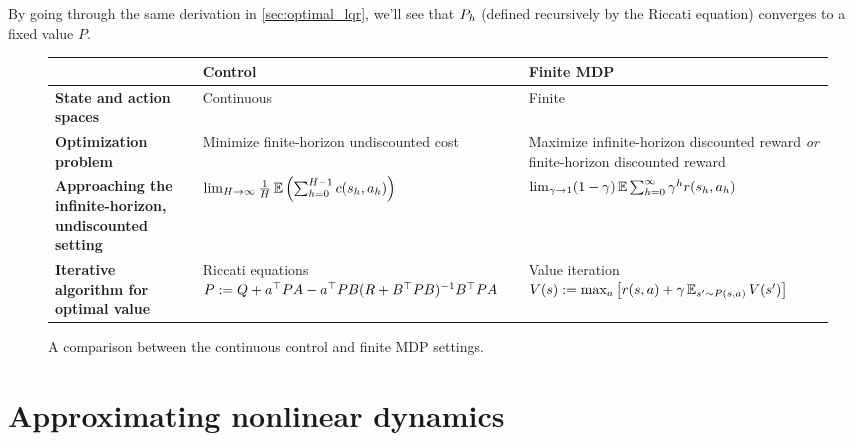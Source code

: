 \documentclass[\main/main]{subfiles}
\begin{document}
    By going through the same derivation in \autoref{sec:optimal_lqr}, we'll see that $P_h$ (defined recursively by the Riccati equation) converges to a fixed value $P$.



    \begin{figure}[h]
        \centering
        \renewcommand{\arraystretch}{1.5}
        \begin{tabularx}{\textwidth}{m{1in} | >{\centering\arraybackslash}X | >{\centering\arraybackslash}X}
                                                                            & \textbf{Control}                                                                                     & \textbf{Finite MDP}                                                                                         \\
            \hline
            \textbf{State and action spaces}                                & Continuous                                                                                           & Finite                                                                                                      \\
            \hline
            \textbf{Optimization problem}                                   & Minimize finite-horizon undiscounted cost                                                            & Maximize infinite-horizon discounted reward \emph{or} finite-horizon discounted reward                      \\
            \hline
            \textbf{Approaching the infinite-horizon, undiscounted setting} & $\lim_{H \to \infty} \frac{1}{H} \operatorname*{\mathbb{E}} \left( \sum_{h=0}^{H-1} c(s_h, a_h) \right)$ & $\lim_{\gamma \to 1} (1 - \gamma) \operatorname*{\mathbb{E}} \sum_{h=0}^{\infty} \gamma^h r(s_h, a_h)$                 \\
            \hline
            \textbf{Iterative algorithm for optimal value}                  & Riccati equations $P := Q + a^\top P A - a^\top P B (R + B^\top P B)^{-1} B^\top P A$          & Value iteration $V(s) := \max_a \left[ r(s, a) + \gamma \operatorname*{\mathbb{E}}_{s' \sim P(s, a)} V(s') \right]$
        \end{tabularx}
        \caption{A comparison between the continuous control and finite MDP settings.}
        \label{fig:control_mdp}
    \end{figure}

\fi

\section{Approximating nonlinear dynamics} \label{sec:approx_nonlinear}
\end{document}
